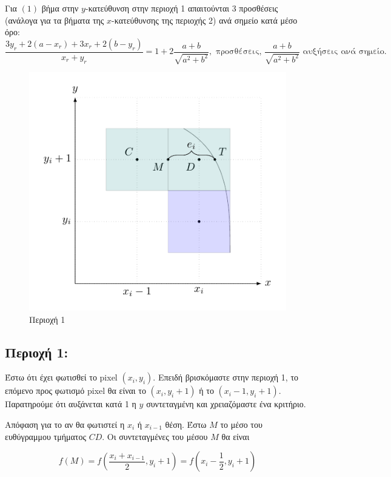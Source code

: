 Για \( (1) \) βήμα στην \( y \)-κατεύθυνση στην περιοχή 1 απαιτούνται 3 προσθέσεις (ανάλογα για τα βήματα της \( x \)-κατεύθυνσης της περιοχής 2) ανά σημείο κατά μέσο όρο:
\[
\frac{3y_r + 2(a-x_r) +3x_r + 2(b-y_r)}{ x_r +y_r} = 1+ 2\frac{a+b}{\sqrt{a^2 + b^2 }}, \text{ προσθέσεις, } \frac{a+b}{\sqrt{a^2 + b^2}} \text{ αυξήσεις ανά σημείο.}
\]

\begin{figure}[hbt]
  \begin{center}
	\includegraphics[scale=1]{Figures/Chapter1/Ellipse/figure2.pdf}
  \end{center}
  \caption{Περιοχή 1}
\end{figure}

\subsection*{Περιοχή 1:}
Έστω ότι έχει φωτισθεί το pixel $(x_i, y_i)$. Επειδή βρισκόμαστε στην περιοχή 1, το επόμενο προς φωτισμό pixel θα είναι το $(x_i, y_i+1)$ ή το $(x_i-1, y_i+1)$. Παρατηρούμε ότι αυξάνεται κατά 1 η $y$ συντεταγμένη και χρειαζόμαστε ένα κριτήριο.

Απόφαση για το αν θα φωτιστεί η $x_i$ ή $x_{i-1}$ θέση. Έστω $M$ το μέσο του ευθύγραμμου τμήματος $CD$. Οι συντεταγμένες του μέσου $M$ θα είναι

\begin{equation}
    f(M) = f \left( \frac{x_i + x_{i-1}}{2}, y_i + 1 \right) = f \left( x_i - \frac{1}{2}, y_i + 1 \right)
\end{equation}

